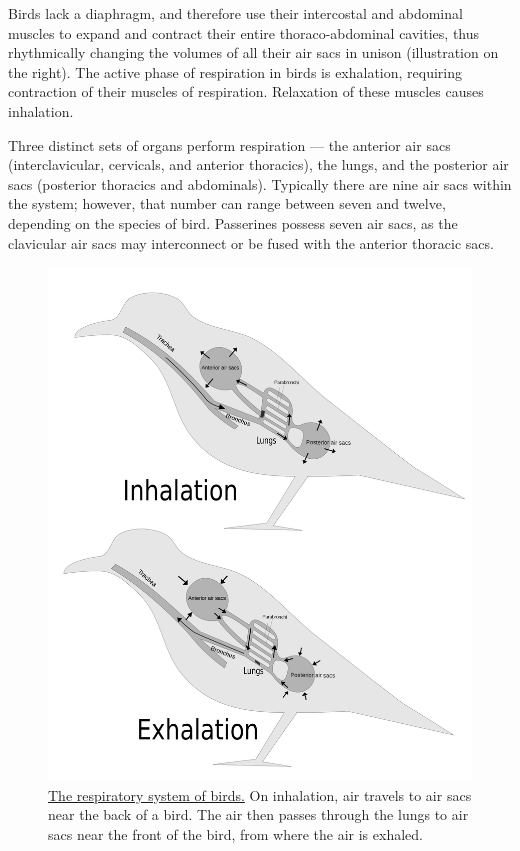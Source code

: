 Birds lack a diaphragm, and therefore use their intercostal and abdominal muscles to expand and contract their entire thoraco-abdominal cavities, thus rhythmically changing the volumes of all their air sacs in unison (illustration on the right). The active phase of respiration in birds is exhalation, requiring contraction of their muscles of respiration. Relaxation of these muscles causes inhalation.

Three distinct sets of organs perform respiration --- the anterior air sacs (interclavicular, cervicals, and anterior thoracics), the lungs, and the posterior air sacs (posterior thoracics and abdominals). Typically there are nine air sacs within the system; however, that number can range between seven and twelve, depending on the species of bird. Passerines possess seven air sacs, as the clavicular air sacs may interconnect or be fused with the anterior thoracic sacs.



\begin{figure}

{\centering \includegraphics[width=0.7\linewidth]{./figures/respiratory/BirdRespiration} 

}

\caption{\href{https://commons.wikimedia.org/wiki/File:BirdRespiration.svg}{The respiratory system of birds.} On inhalation, air travels to air sacs near the back of a bird. The air then passes through the lungs to air sacs near the front of the bird, from where the air is exhaled.}\label{fig:birdrespiration}
\end{figure}

